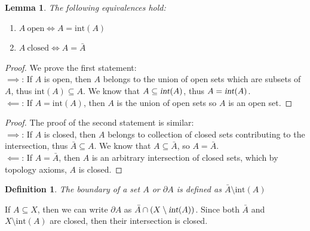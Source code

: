 \documentclass{article}
\newtheorem{lem}{Lemma}[section]
\newtheorem{defn}{Definition}[section]
\begin{document}
\medskip
\begin{lem} The following equivalences hold:
    \begin{enumerate}
        \item $A \ \text{open} \iff A = \text{int}(A)$
        \item $A \ \text{closed} \iff A = \bar{A}$
    \end{enumerate}
\end{lem}
\begin{proof}We prove the first statement:\\
$\implies$: If $A$ is open, then $A$ belongs to the union of open sets which are subsets of $A$, thus $\text{int}(A) \subseteq A$. We know that $A \subseteq \textsl{int}(A)$, thus $A = \textsl{int}(A)$.\\

$\impliedby$: If $A = \text{int}(A)$, then $A$ is the union of open sets so $A$ is an open set.
\end{proof}

\begin{proof} The proof of the second statement is similar:\\
$\implies$: If $A$ is closed, then $A$ belongs to collection of closed sets contributing to the intersection, thus $\bar{A} \subseteq A$. We know that $A \subseteq \bar{A}$, so $A = \bar{A}$.\\

$\impliedby$: If $A = \bar{A}$, then $A$ is an arbitrary intersection of closed sets, which by topology axioms, $A$ is closed.
\end{proof}

\medskip
\begin{defn}
The boundary of a set $A$ or $\partial A$ is defined as $\bar{A} \setminus \text{int}(A)$
\end{defn}
If $A \subseteq X$, then we can write $\partial A$ as $\bar{A} \cap (X \setminus \textsl{int}(A))$. Since both $\bar{A}$ and $X \setminus \text{int}(A)$ are closed, then their intersection is closed.
\end{document}
